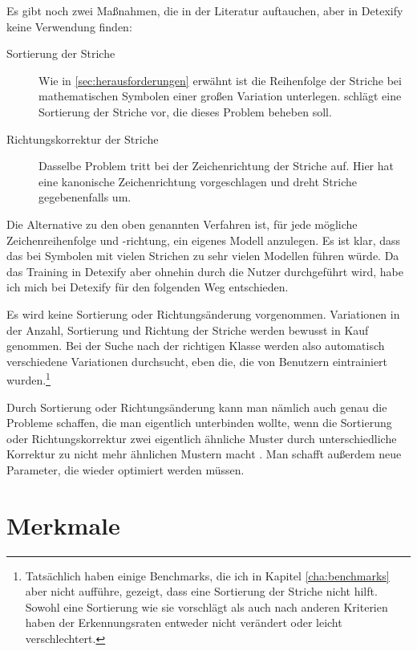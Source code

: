 
Es gibt noch zwei Maßnahmen, die in der Literatur auftauchen, aber in Detexify keine Verwendung finden:

\begin{description}
  \item[Sortierung der Striche] Wie in \ref{sec:herausforderungen} erwähnt ist die Reihenfolge der Striche bei mathematischen Symbolen einer großen Variation unterlegen. \citet{Matasakis:1999p9465} schlägt eine Sortierung der Striche vor, die dieses Problem beheben soll.
  \item[Richtungskorrektur der Striche] Dasselbe Problem tritt bei der Zeichenrichtung der Striche auf. Hier hat \citet{Matasakis:1999p9465} eine kanonische Zeichenrichtung vorgeschlagen und dreht Striche gegebenenfalls um.
\end{description}

Die Alternative zu den oben genannten Verfahren ist, für jede mögliche Zeichenreihenfolge und -richtung, ein eigenes Modell anzulegen. Es ist klar, dass das bei Symbolen mit vielen Strichen zu sehr vielen Modellen führen würde. Da das Training in Detexify aber ohnehin durch die Nutzer durchgeführt wird, habe ich mich bei Detexify für den folgenden Weg entschieden.

Es wird keine Sortierung oder Richtungsänderung vorgenommen. Variationen in der Anzahl, Sortierung und Richtung der Striche werden bewusst in Kauf genommen. Bei der Suche nach der richtigen Klasse werden also automatisch verschiedene Variationen durchsucht, eben die, die von Benutzern eintrainiert wurden.\footnote{Tatsächlich haben einige Benchmarks, die ich in Kapitel \ref{cha:benchmarks} aber nicht aufführe, gezeigt, dass eine Sortierung der Striche nicht hilft. Sowohl eine Sortierung wie \citet{Matasakis:1999p9465} sie vorschlägt als auch nach anderen Kriterien haben der Erkennungsraten entweder nicht verändert oder leicht verschlechtert.}

Durch Sortierung oder Richtungsänderung kann man nämlich auch genau die Probleme schaffen, die man eigentlich unterbinden wollte, wenn die Sortierung oder Richtungskorrektur zwei eigentlich ähnliche Muster durch unterschiedliche Korrektur zu nicht mehr ähnlichen Mustern macht \cite{Matasakis:1999p9465}. Man schafft außerdem neue Parameter, die wieder optimiert werden müssen.

\section{Merkmale} \label{sec:merkmale}


